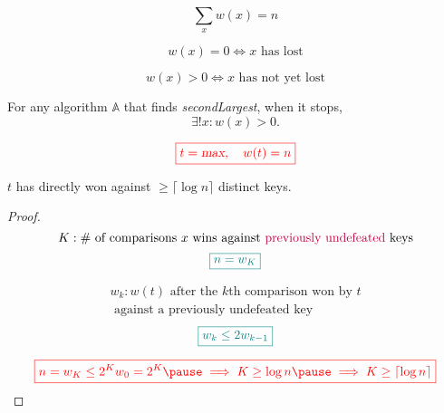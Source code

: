 \begin{frame}{}
  \[
    \sum_x w(x) = n
  \]

  \pause
  \[
    w(x) = 0 \iff x \text{ has lost}
  \]

  \pause
  \[
    w(x) > 0 \iff x \text{ has not yet lost}
  \]

  \pause
  \begin{theorem}
    For any algorithm $\mathbb{A}$ that finds \textsl{secondLargest}, when it stops,
    \[
      \exists! x: w(x) > 0.
    \]
  \end{theorem}

  \pause
  \[
    \textcolor{red}{\boxed{t = \textsl{max}, \quad w(t) = n}}
  \]
\end{frame}

\begin{frame}{}
  \begin{theorem}
    $t$ has directly won against $\ge \lceil \log n \rceil$ distinct keys.
  \end{theorem}

  \begin{proof}
    \[
      K: \# \text{ of comparisons } x \text{ wins against \textcolor{purple}{previously undefeated} keys}
    \]
    \pause
    \vspace{-0.30cm}
    \[
      \textcolor{teal}{\boxed{n = w_K}}
    \]

    \pause
    \vspace{-0.60cm}
    \begin{align*}
      w_k: w(t) \text{ after the } k\text{th comparison won by } t \\
      \text{ against a previously undefeated key}
    \end{align*}
    \pause
    \vspace{-0.30cm}
    \[
      \textcolor{teal}{\boxed{w_k \le 2 w_{k-1}}}
    \]

    \pause
    \[
      \red{\boxed{n = w_K \le 2^K w_0 = 2^K \pause \implies K \ge \log n \pause \implies K \ge \lceil \log n \rceil}}
    \]
  \end{proof}
\end{frame}

